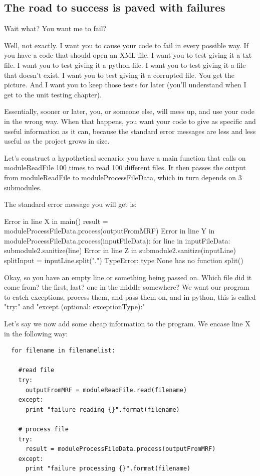 \documentclass[10pt,a4paper]{article}
\begin{document}
\subsection{The road to success is paved with failures}

Wait what? You want me to fail?

Well, not exactly. I want you to cause your code to fail in every possible way. If you have a code that should open an XML file, I want you to test giving it a txt file. I want you to test giving it a python file. I want you to test giving it a file that doesn't exist. I want you to test giving it a corrupted file. You get the picture. And I want you to keep those tests for later (you'll understand when I get to the unit testing chapter).

Essentially, sooner or later, you, or someone else, will mess up, and use your code in the wrong way. When that happens, you want your code to give as specific and useful information as it can, because the standard error messages are less and less useful as the project grows in size.

Let's construct a hypothetical scenario:
you have a main function that calls on moduleReadFile 100 times to read 100 different files. It then passes the output from moduleReadFile to moduleProcessFileData, which in turn depends on 3 submodules. 

The standard error message you will get is: %

Error in line X in main()
  result = moduleProcessFileData.process(outputFromMRF)
Error in line Y in moduleProcessFileData.process(inputFileData):
  for line in inputFileData:
    submodule2.sanitize(line)
Error in line Z in submodule2.sanitize(inputLine)
  splitInput = inputLine.split(".")
TypeError: type None has no function split()

Okay, so you have an empty line or something being passed on. Which file did it come from? the first, last? one in the middle somewhere? We want our program to catch exceptions, process them, and pass them on, and in python, this is called "try:" and "except (optional: exceptionType):"

Let's say we now add some cheap information to the program. We encase line X in the following way:

\begin{lstlisting}
  for filename in filenamelist:

    #read file
    try:
      outputFromMRF = moduleReadFile.read(filename)
    except:
      print "failure reading {}".format(filename)
      
    # process file
    try: 
      result = moduleProcessFileData.process(outputFromMRF)
    except: 
      print "failure processing {}".format(filename)
\end{lstlisting}
\end{document}
